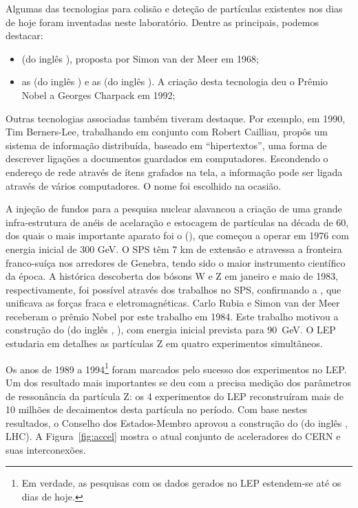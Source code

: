Algumas das tecnologias para colisão e deteção de partículas existentes nos
dias de hoje foram inventadas neste laboratório. Dentre as principais, podemos
destacar:

\begin{itemize}
\item {} (do inglês
), proposta por Simon van der Meer em
1968;

\item as  (do inglês
) e as  (do
inglês ). A criação desta tecnologia deu o Prêmio Nobel
a Georges Charpack em 1992;
\end{itemize}

Outras tecnologias associadas também tiveram destaque. Por exemplo, em 1990,
Tim Berners-Lee, trabalhando em conjunto com Robert Cailliau, propôs um
sistema de informação distribuída, baseado em ``hipertextos'', uma forma de
descrever ligações a documentos guardados em computadores. Escondendo o
endereço de rede através de ítens grafados na tela, a informação pode ser
ligada através de vários computadores. O nome  foi
escolhido na ocasião.

A injeção de fundos para a pesquisa nuclear alavancou a criação de uma grande
infra-estrutura de anéis de acelaração e estocagem de partículas na década de
60, dos quais o mais importante aparato foi o  (), que começou a operar em 1976 com energia inicial de
300 GeV. O SPS têm 7 km de extensão e atravessa a fronteira franco-suíça nos
arredores de Genebra, tendo sido o maior instrumento científico da época.  A
histórica descoberta dos bósons W e Z em janeiro e maio de 1983,
respectivamente, foi possível através dos trabalhos no SPS, confirmando a
, que unificava as forças fraca e
eletromagnéticas. Carlo Rubia e Simon van der Meer
receberam o prêmio Nobel por este trabalho em 1984. Este trabalho motivou a
construção do  (do inglês
, ), com energia inicial
prevista para 90~GeV. O LEP estudaria em detalhes as partículas Z em quatro
experimentos simultâneos.

Os anos de 1989 a 1994\footnote{Em verdade, as pesquisas com os dados gerados
no LEP estendem-se até os dias de hoje.} foram marcados pelo sucesso dos
experimentos no LEP. Um dos resultado mais importantes se deu com a precisa
medição dos parâmetros de ressonância da partícula Z: os 4 experimentos do LEP
reconstruíram mais de 10 milhões de decaimentos desta partícula no
período. Com base nestes resultados, o Conselho dos Estados-Membro aprovou a
construção do  (do inglês , LHC). A Figura~\ref{fig:accel} mostra o atual conjunto de
aceleradores do CERN e suas interconexões.

